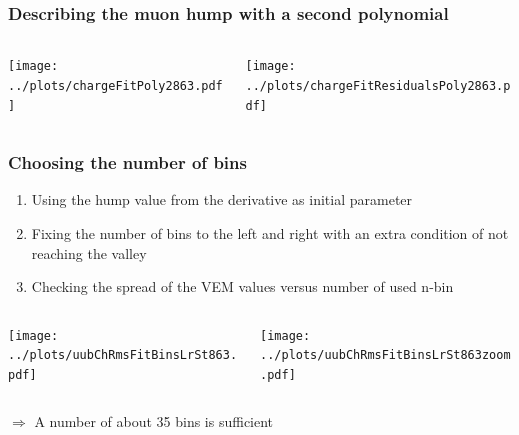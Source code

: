 \documentclass[aspectratio=169]{beamer}
\begin{document}
\begin{frame} 
  \frametitle{Describing the muon hump with a second polynomial}
  \begin{columns}
    \begin{column}{0.55\textwidth}
      \texttt{[image: ../plots/chargeFitPoly2863.pdf]}
    \end{column}
    \begin{column}{0.55\textwidth}
      \texttt{[image: ../plots/chargeFitResidualsPoly2863.pdf]}
    \end{column}
  \end{columns}
\end{frame}

\begin{frame} 
  \frametitle{Choosing the number of bins}
  \begin{enumerate}
    \item Using the hump value from the derivative as initial parameter
    \item Fixing the number of bins to the left and right
      with an extra condition of not reaching the valley
    \item Checking the spread of the VEM values versus number
      of used n-bin
  \end{enumerate}
  \begin{center}
    \begin{columns}
      \begin{column}{0.55\textwidth}
        \texttt{[image: ../plots/uubChRmsFitBinsLrSt863.pdf]}
      \end{column}
      \begin{column}{0.55\textwidth}
        \texttt{[image: ../plots/uubChRmsFitBinsLrSt863zoom.pdf]}
      \end{column}
    \end{columns}
  \end{center}
     \hfill $\Rightarrow$ A number of about 35 bins is sufficient 
\end{frame}
\end{document}
